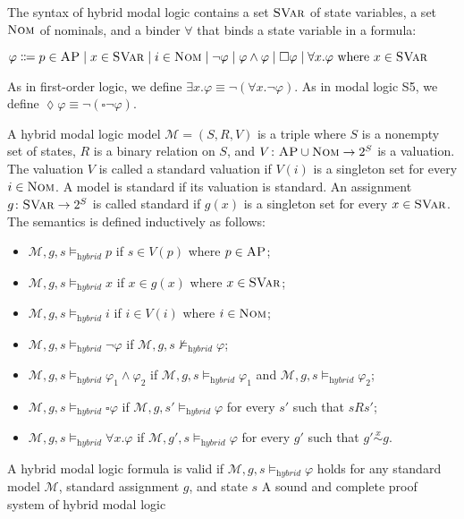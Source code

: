\documentclass[letter,12pt]{article}
\newcommand{\SVar}{\textnormal{\textsc{SVar}}}
\newcommand{\Nom}{\textnormal{\textsc{Nom}}}
\newcommand{\MM}{\mathcal{M}}
\newcommand{\pset}[1]{2^{#1}}
\newcommand{\simon}[1]{\overset{#1}{\sim}}
\newcommand{\simx}{\simon{x}}
\newcommand{\hybridModalLogic}{\textit{hybrid}}
\newcommand{\AP}{\textsc{AP}}
\newcommand{\always}{{\square}}
\newcommand{\eventually}{{\lozenge}}
\begin{document}
The syntax of hybrid modal logic contains
a set $\SVar$ of state variables,
a set $\Nom$ of nominals,
and a binder $\forall$ that binds a state variable in a formula:
\begin{center}
$\varphi \Coloneqq
p \in \AP \mid x \in \SVar \mid i \in \Nom \mid
\neg \varphi \mid \varphi \wedge \varphi \mid
\always \varphi \mid \forall x . \varphi \text{ where $x \in \SVar$}
	$
\end{center}
As in first-order logic,
we define $\exists x . \varphi \equiv \neg (\forall x . \neg \varphi)$.
As in modal logic S5,
we define $\eventually \varphi \equiv \neg (\always \neg \varphi)$.

A hybrid modal logic model
$\MM = (S, R, V)$ is a triple where
$S$ is a nonempty set of states,
$R$ is a binary relation on $S$,
and $V \colon \AP \cup \Nom \to \pset{S}$ is a valuation.
The valuation $V$ is called a standard valuation if $V(i)$ is a singleton set
for every $i \in \Nom$.
A model is standard if its valuation is standard.
An assignment $g \colon \SVar \to \pset{S}$ is called standard
if $g(x)$ is a singleton set for every $x \in \SVar$.
The semantics is defined inductively as follows:
\begin{itemize}
\item $\MM,g,s \vDash_\hybridModalLogic p$
      if $s \in V(p)$ where $p \in \AP$;
\item $\MM,g,s \vDash_\hybridModalLogic x$
      if $x \in g(x)$ where $x \in \SVar$;
\item $\MM,g,s \vDash_\hybridModalLogic i$
      if $i \in V(i)$ where $i \in \Nom$;
\item $\MM,g,s \vDash_\hybridModalLogic \neg \varphi$
      if $\MM,g,s \not \vDash_\hybridModalLogic \varphi$;
\item $\MM,g,s \vDash_\hybridModalLogic \varphi_1 \wedge \varphi_2$
      if  $\MM,g,s \vDash_\hybridModalLogic \varphi_1$
      and $\MM,g,s \vDash_\hybridModalLogic \varphi_2$;
\item $\MM,g,s \vDash_\hybridModalLogic \always \varphi$
      if $\MM,g,s' \vDash_\hybridModalLogic \varphi$
      for every $s'$ such that $s R s'$;
\item $\MM,g,s \vDash_\hybridModalLogic \forall x . \varphi$
      if $\MM,g',s \vDash_\hybridModalLogic \varphi$
      for every $g'$ such that $g' \simx g$.
\end{itemize}
A hybrid modal logic formula is valid
if $\MM,g,s \vDash_\hybridModalLogic \varphi$ 
holds for any standard model $\MM$, standard assignment $g$, and state $s$
A sound and complete proof system of hybrid modal logic
\end{document}
